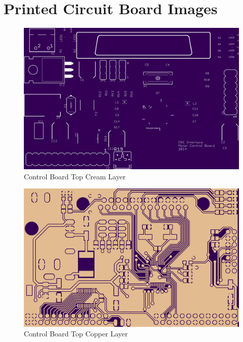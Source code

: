 \chapter{Printed Circuit Board Images}

\begin{figure}[h]
	\centering
	\includegraphics[width=1\textwidth]{pcb-design/ctopcream.png}
	\caption{Control Board Top Cream Layer}
	\label{fig:control-top-cream}
\end{figure}
\begin{figure}[h]
	\centering
	\includegraphics[width=1\textwidth]{pcb-design/ctoproute.png}
	\caption{Control Board Top Copper Layer}
	\label{fig:control-top-copper}
\end{figure}
